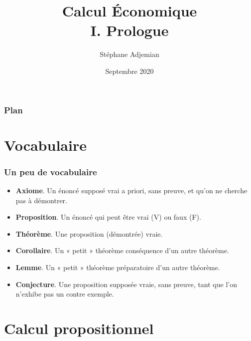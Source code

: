 \documentclass[10pt,notheorems]{beamer}
\theoremstyle{plain}
\theoremstyle{definition} %
\begin{document}
\title{Calcul Économique\\\small{I. Prologue}}
\author[S. Adjemian]{Stéphane Adjemian}
 \date{Septembre 2020}

\begin{frame}
  \titlepage{}
\end{frame}

\begin{frame}
  \frametitle{Plan}
  \tableofcontents
\end{frame}

\section{Vocabulaire}

\begin{frame}
  \frametitle{Un peu de vocabulaire}
  \hypertarget{slide_vocabulaire}{}

  \begin{itemize}

  \item \textbf{Axiome}. Un énoncé supposé vrai a priori, sans preuve,
    et qu'on ne cherche pas à démontrer.\newline

  \item \textbf{Proposition}. Un énoncé qui peut être vrai (V) ou faux
    (F).\newline

  \item \textbf{Théorème}. Une proposition (démontrée) vraie.\newline

  \item \textbf{Corollaire}. Un « petit » théorème conséquence
    d'un autre théorème.\newline

  \item \textbf{Lemme}. Un « petit » théorème préparatoire d'un
    autre théorème.\newline

  \item \textbf{Conjecture}. Une proposition supposée vraie, sans
    preuve, tant que l'on n'exhibe pas un contre exemple.\newline

  \end{itemize}

\end{frame}

\section{Calcul propositionnel}
\end{document}
